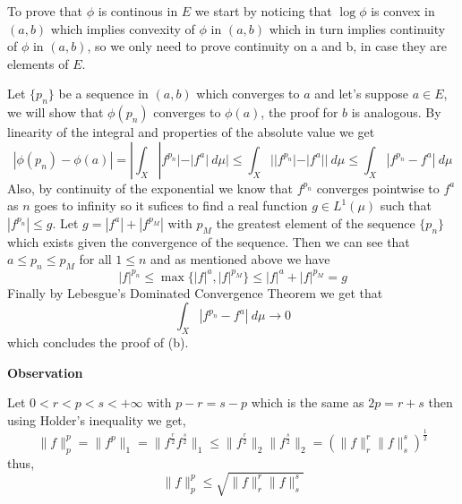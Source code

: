 \documentclass{article}
\begin{document}
\begin{exercise}
\bigbreak

    To prove that $\phi$ is continous in $E$ we start by noticing that $\log \phi$ is convex in $ \left( a,b \right) $ which implies convexity of $\phi$ in $ \left( a,b \right) $ which in turn implies continuity of $\phi$ in $ \left( a,b \right) $, so we only need to prove continuity on a and b, in case they are elements of $E$.

    Let $\{p_n\}$ be a sequence in $ \left( a,b \right) $ which converges to $a$ and let's suppose $a \in E$, we will show that $\phi \left( p_n \right) $ converges to $\phi \left( a \right) $, the proof for $b$ is analogous. By linearity of the integral and properties of the absolute value we get
    \[
        |\phi \left( p_n \right) - \phi \left( a \right) | = | \int_X |f^{p_n}| - |f^a|\: d\mu | \le \int_X ||f^{p_n}|-|f^a||\: d\mu \le \int_X |f^{p_n} - f^a|\: d\mu 
    \]
    Also, by continuity of the exponential we know that $f^{p_n}$ converges pointwise to $f^a$ as $n$ goes to infinity so it sufices to find a real function $g \in L^1 \left( \mu \right) $ such that $|f^{p_n}| \le g$. Let $g=|f^a|+|f^{p_M}|$ with $p_M$ the greatest element of the sequence $\{p_n\}$ which exists given the convergence of the sequence. Then we can see that $a \le p_n \le p_M$ for all $1 \le n$ and as mentioned above we have
    \[
        |f|^{p_n} \le \max \{ |f|^a , |f|^{p_M}\} \le |f|^a + |f|^{p_M} = g
    \]
    Finally by Lebesgue's Dominated Convergence Theorem we get that
    \[
        \int_X |f^{p_n} - f^a|\: d\mu \rightarrow 0   
    \]
    which concludes the proof of (b).

\bigbreak

\begin{observation}\textbf{Observation}

Let $0 < r < p < s < +\infty$ with $p-r=s-p$ which is the same as $2p=r+s$ then using Holder's inequality we get,  
\[
    \|f\|_p^p = \|f^p\|_1 = \|f^{\frac{r}{2}}f^{\frac{s}{2}}\|_1 \le \|f^{\frac{r}{2}}\|_2 \|f^{\frac{s}{2}}\|_2 = \left( \|f\|_r^r \|f\|_s^s   \right)^{\frac{1}{2}}    
\]
thus,
\[
    \|f\|_p^p \le \sqrt{\|f\|_r^r \|f\|_s^s  }   
\]
\end{observation}

\end{exercise}

\bigbreak
\end{document}

